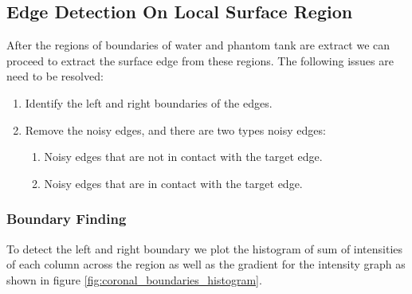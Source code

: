 \subsection{Edge Detection On Local Surface Region}

After the regions of boundaries of water and phantom tank are extract we can proceed to extract the surface
edge from these regions. The following issues are need to be resolved:
\begin{enumerate}
  \item Identify the left and right boundaries of the edges.
  \item Remove the noisy edges, and there are two types noisy edges:
    \begin{enumerate}
      \item Noisy edges that are not in contact with the target edge.
      \item Noisy edges that are in contact with the target edge.
    \end{enumerate}
\end{enumerate}

\subsubsection{Boundary Finding}

To detect the left and right boundary we plot the histogram of sum of intensities of each column across the
region as well as the gradient for the intensity graph as shown in figure 
\ref{fig:coronal_boundaries_histogram}. 

